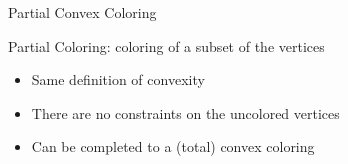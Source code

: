 \begin{frame}{Partial Convex Coloring}
\begin{definition}
\alert{Partial Coloring}: coloring of a subset of the vertices
\end{definition}

\begin{itemize}

\pause\item
Same definition of convexity

\pause\item
There are no constraints on the uncolored vertices

\end{itemize}
\pause

\begin{itemize}
\pause\item
Can be completed to a (total) convex coloring
\end{itemize}
\end{frame}

